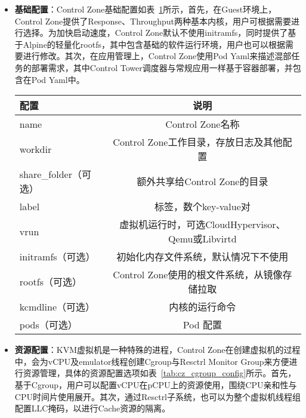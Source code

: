 \begin{itemize}
    \item \textbf{基础配置}：Control Zone基础配置如表~\ref{tab:cz_meta_config}所示，首先，在Guest环境上，Control Zone提供了Response、Throughput两种基本内核，用户可根据需要进行选择。为加快启动速度，Control Zone默认不使用initramfs，同时提供了基于Alpine的轻量化rootfs，其中包含基础的软件运行环境，用户也可以根据需要进行修改。其次，在应用管理上，Control Zone使用Pod Yaml来描述混部任务的部署需求，其中Control Tower调度器与常规应用一样基于容器部署，并包含在Pod Yaml中。

\begin{table}[H]
    \label{tab:cz_meta_config}
    \footnotesize%
    \setlength{\tabcolsep}{4pt}%
    \renewcommand{\arraystretch}{1.25}%
    \centering
    \begin{tabular}{lc}
        \hline
        配置 & 说明\\
        \hline
        name & Control Zone名称 \\
        workdir & Control Zone工作目录，存放日志及其他配置 \\
        share\_folder（可选） & 额外共享给Control Zone的目录 \\
        label & 标签，数个key-value对 \\
        vrun & 虚拟机运行时，可选CloudHypervisor、Qemu或Libvirtd \\
        initramfs（可选） & 初始化内存文件系统，默认情况下不使用 \\
        rootfs（可选） & Control Zone使用的根文件系统，从镜像存储拉取\\
        kcmdline（可选） & 内核的运行命令 \\
        pods（可选） & Pod 配置 \\
        \hline
    \end{tabular}
\end{table}

    \item \textbf{资源配置}：KVM虚拟机是一种特殊的进程，Control Zone在创建虚拟机的过程中，会为vCPU及emulator线程创建Cgroup与Resctrl Monitor Group来方便进行资源管理，具体的资源配置选项如表~\ref{tab:cz_cgroup_config}所示。首先，基于Cgroup，用户可以配置vCPU在pCPU上的资源使用，围绕CPU亲和性与CPU时间片使用展开。其次，通过Resctrl子系统，也可以为整个虚拟机线程组配置LLC掩码，以进行Cache资源的隔离。


\end{itemize}

